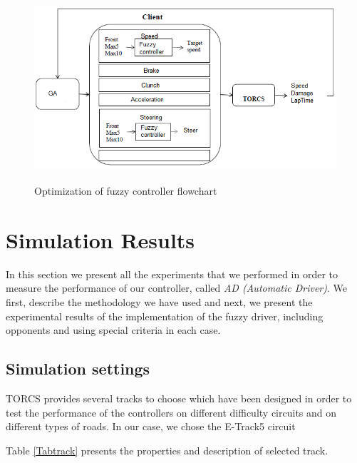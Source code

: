 \documentclass[runningheads,a4paper]{llncs}
\begin{document}
\begin{figure}[!h]
	\begin{center}
		\includegraphics[width=13cm,height=7cm]{fig/mo}
	\end{center}
	\caption{Optimization of fuzzy controller flowchart }
\end{figure}	


	
	\section{Simulation Results}
	\label{sec:results}
	
	In this section we present all the experiments that we performed in order to measure the performance of our controller, called \textit{AD (Automatic Driver)}.
	We first, describe the methodology we have used and next, we present the experimental results of the implementation of the fuzzy driver, including opponents and using special criteria in each case.
	
	\subsection{Simulation settings}
	
	TORCS provides several tracks to choose which have been designed in order to test the performance of the controllers on different difficulty circuits and on different types of roads.
	In our case, we chose the E-Track5 circuit
	
	
	Table \ref{Tabtrack} presents the properties and description of selected track.
	
\end{document}
